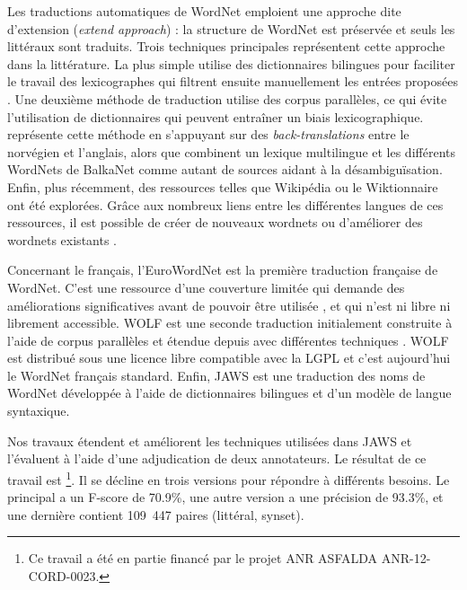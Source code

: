 Les traductions automatiques de WordNet emploient une approche dite d'extension (\textit{extend approach}) : la structure de WordNet est préservée et seuls les littéraux sont traduits. Trois techniques principales représentent cette approche dans la littérature. La plus simple utilise des dictionnaires bilingues pour faciliter le travail des lexicographes qui filtrent ensuite manuellement les entrées proposées \citep{vossen1998eurowordnet,pianta2002developing,tufis2004balkanet}. Une deuxième méthode de traduction utilise des corpus parallèles, ce qui évite l'utilisation de dictionnaires qui peuvent entraîner un biais lexicographique. \cite{dyvik2004translations} représente cette méthode en s'appuyant sur des \textit{back-translations} entre le norvégien et l'anglais, alors que \citep{SagotFiser2008} combinent un lexique multilingue et les différents WordNets de BalkaNet comme autant de sources aidant à la désambiguïsation. Enfin, plus récemment, des ressources telles que Wikipédia ou le Wiktionnaire ont été explorées. Grâce aux nombreux liens entre les différentes langues de ces ressources, il est possible de créer de nouveaux wordnets \citep{melo2009towards,navigli2010babelnet} ou d'améliorer des wordnets existants \citep{hanoka2012wordnet}.

Concernant le français, l'EuroWordNet \citep{vossen1998eurowordnet} est la première traduction française de WordNet. C'est une ressource d'une couverture limitée qui demande des améliorations significatives avant de pouvoir être utilisée \citep{jacquin_al2007}, et qui n'est ni libre ni librement accessible. WOLF est une seconde traduction initialement construite à l'aide de corpus parallèles \citep{SagotFiser2008} et étendue depuis avec différentes techniques \citep{ApidianakiSagot2012}. WOLF est distribué sous une licence libre compatible avec la LGPL et c'est aujourd'hui le WordNet français standard. Enfin, JAWS \citep{MoutonChalendar2010} est une traduction des noms de WordNet développée à l'aide de dictionnaires bilingues et d'un modèle de langue syntaxique.

Nos travaux étendent et améliorent les techniques utilisées dans JAWS et l'évaluent à l'aide d'une adjudication de deux annotateurs. Le résultat de ce travail est \newjaws{}\footnote{Ce travail a été en partie financé par le projet ANR ASFALDA ANR-12-CORD-0023.}. Il se décline en trois versions pour répondre à différents besoins. Le \newjaws{} principal a un F-score de 70.9\%, une autre version a une précision de 93.3\%, et une dernière contient 109~447 paires (littéral, synset).

